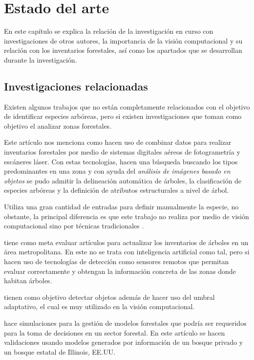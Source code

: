 \chapter{Estado del arte}
En este capítulo se explica la relación de la investigación en curso con investigaciones de otros autores, la importancia de la visión computacional y su relación con los inventarios forestales, así como los apartados que se desarrollan durante la investigación.

\section{Investigaciones relacionadas}
Existen algunos trabajos que no están completamente relacionados con el objetivo de identificar especies arbóreas, pero si existen investigaciones que toman como objetivo el analizar zonas forestales.

Este artículo nos menciona como hacen uso de combinar datos para realizar inventarios forestales por medio de sistemas digitales aéreos de fotogrametría y escáneres láser. Con estas tecnologías, hacen una búsqueda buscando los tipos predominantes en una zona y con ayuda del \emph{análisis de imágenes basado en objetos} se pudo admitir la delineación automática de árboles, la clasificación de especies arbóreas y la definición de atributos estructurales a nivel de árbol. 
\newline
\break


\cite{rf1} Utiliza una gran cantidad de entradas para definir manualmente la especie, no obstante, la principal diferencia es que este trabajo no realiza por medio de visión computacional sino por técnicas tradicionales .
 
\cite{rf2} tiene como meta evaluar artículos para actualizar los inventarios de árboles en un área metropolitana. En este no se trata con inteligencia artificial como tal, pero si hacen uso de tecnologías de detección como sensores remotos que permitan evaluar correctamente y obtengan la información concreta de las zonas donde habitan  árboles.

\cite{rf3} tienen como objetivo detectar objetos además de hacer uso del umbral adaptativo, el cual es muy utilizado en la visión computacional. %

\cite{rf9} hace simulaciones para la gestión de modelos forestales que podría ser requeridos para la toma de decisiones en un sector forestal. En este artículo se hacen validaciones usando modelos generados por información de un bosque privado y un bosque estatal de Illinois, EE.UU.

